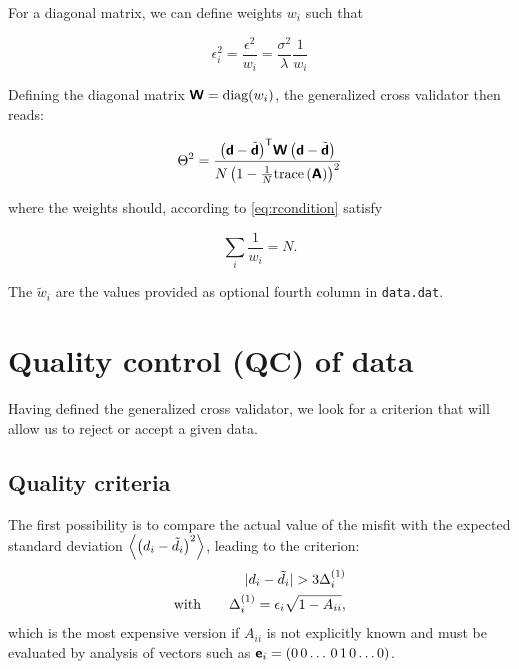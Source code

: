 For a diagonal matrix, we can define weights $w_i$ such that

\begin{equation}
\epsilon^2_i = \frac{\epsilon^2}{w_i}= \frac{\sigma^2}{\lambda}\frac{1}{w_i}
\end{equation}

Defining the diagonal matrix $\mbox{\boldmath $ \protect\mathsf{W} $} = \mbox{diag}(w_i)$, the generalized cross validator then reads:

\begin{equation}
\Theta^2=\frac{ {\left(\mbox{\boldmath $ \protect\mathsf{d} $}-\tilde{\mbox{\boldmath $ \protect\mathsf{d} $}}\right)}^\mathsf{T} \mbox{\boldmath $ \protect\mathsf{W} $} \left(\mbox{\boldmath $ \protect\mathsf{d} $}-\tilde{\mbox{\boldmath $ \protect\mathsf{d} $}}\right) }{ N \left(1 - \frac{1}{N}\mathrm{trace}\left( \mbox{\boldmath $ \protect\mathsf{A} $} \right)\right)^2} 
\label{eq:gcvbis}
\end{equation}

where the weights should, according to \eqref{eq:rcondition} satisfy

\begin{equation}
\sum_i \frac{1 }{w_i} = N.
\label{eq:condition}
\end{equation}

The $\tilde{w}_i$ are the values provided as optional fourth column in \texttt{data.dat}.

\section{Quality control (QC) of data\label{secdivaqc}}

Having defined the generalized cross validator, we look for a criterion that will allow us to reject or accept a given data.

\subsection{Quality criteria}

The first possibility is to compare the actual value of the misfit with the expected standard deviation $\left\langle \left(d_i - \tilde{d}_i\right)^2 \right\rangle$, leading to the criterion:
\begin{eqnarray}
| d_i - \tilde{d}_i | > 3 \Delta_i^{(1)}\\
\textrm{with}  \qquad \Delta_i^{(1)} = \epsilon_i \sqrt{1-A_{ii}},\label{eq:qc1}
\end{eqnarray}
which is the most expensive version if $A_{ii}$ is not explicitly known and must be evaluated by analysis of vectors such as $\mbox{\boldmath $ \protect\mathsf{e} $}_i=(0\,0\ldots\,0\,1\,0\ldots 0)$. 

